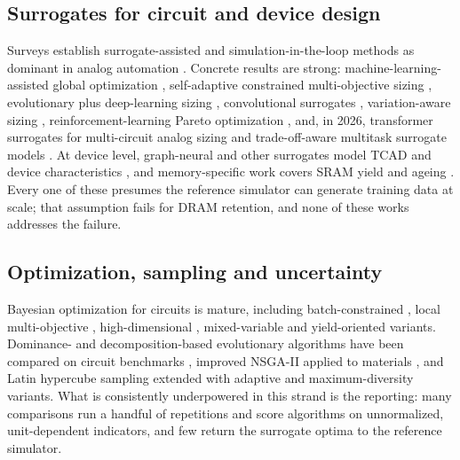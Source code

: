\documentclass[11pt,a4paper]{article}
\begin{document}
\subsection{Surrogates for circuit and device design}

Surveys establish surrogate-assisted and simulation-in-the-loop methods as
dominant in analog automation \cite{huang2021mleda,afacan2021review,mina2022review}.
Concrete results are strong: machine-learning-assisted global optimization
\cite{budak2022sizing,rashid2024global}, self-adaptive constrained
multi-objective sizing \cite{yin2023surrogate}, evolutionary plus deep-learning
sizing \cite{lberni2024eadl}, convolutional surrogates \cite{tang2024cnn},
variation-aware sizing \cite{song2022mlsizing}, reinforcement-learning Pareto
optimization \cite{ns2024pareto}, and, in 2026, transformer surrogates for
multi-circuit analog sizing \cite{vlsi2026transformer} and trade-off-aware
multitask surrogate models \cite{tcad2026multitask}. At device level,
graph-neural and other surrogates model TCAD and device characteristics
\cite{jang2023gnn,wang2023tcadcal,akbar2022devsim,guo2023pinn,liu2025sann,liang2021esd,li2025devmodel},
and memory-specific work covers SRAM yield and ageing
\cite{yoon2023sram,shaik2024sramaging}. Every one of these presumes the reference
simulator can generate training data at scale; that assumption fails for DRAM
retention, and none of these works addresses the failure.

\subsection{Optimization, sampling and uncertainty}

Bayesian optimization for circuits is mature, including batch-constrained
\cite{zhang2022batchbo}, local multi-objective \cite{touloupas2022locomobo},
high-dimensional \cite{chen2022highdimbo}, mixed-variable
\cite{touloupas2022mixedbo} and yield-oriented \cite{wang2022yieldbo} variants.
Dominance- and decomposition-based evolutionary algorithms have been compared on
circuit benchmarks \cite{saglican2023moead}, improved NSGA-II applied to
materials \cite{zhang2021nsga2mat}, and Latin hypercube sampling extended with
adaptive \cite{borisut2023alhs} and maximum-diversity \cite{phromphan2024lhs}
variants. What is consistently underpowered in this strand is the reporting: many
comparisons run a handful of repetitions and score algorithms on unnormalized,
unit-dependent indicators, and few return the surrogate optima to the reference
simulator.
\end{document}
